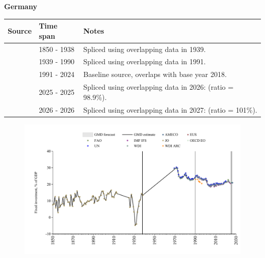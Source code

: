 \documentclass[12pt,a4paper,landscape]{article}
\begin{document}
\begin{adjustbox}{max totalsize={\paperwidth}{\paperheight},center}
\begin{minipage}[t][\textheight][t]{\textwidth}
\vspace*{0.5cm}
{}
\begin{center}
{\Large\bfseries Germany}
\end{center}
\vspace{0.5cm}
\begin{table}[H]
\centering
\small
\begin{tabular}{|l|l|l|}
\hline
\textbf{Source} & \textbf{Time span} & \textbf{Notes} \\
\hline
\rowcolor{white}\cite{JO}& 1850 - 1938 &Spliced using overlapping data in 1939.\\
\rowcolor{lightgray}\cite{WDI}& 1939 - 1990 &Spliced using overlapping data in 1991.\\
\rowcolor{white}\cite{EUS}& 1991 - 2024 &Baseline source, overlaps with base year 2018.\\
\rowcolor{lightgray}\cite{OECD_EO}& 2025 - 2025 &Spliced using overlapping data in 2026: (ratio = 98.9\%).\\
\rowcolor{white}\cite{AMECO}& 2026 - 2026 &Spliced using overlapping data in 2027: (ratio = 101\%).\\
\hline
\end{tabular}
\end{table}
\begin{figure}[H]
\centering
\includegraphics[width=\textwidth,height=0.6\textheight,keepaspectratio]{graphs/DEU_finv_GDP.pdf}
\end{figure}
\end{minipage}
\end{adjustbox}
\end{document}
